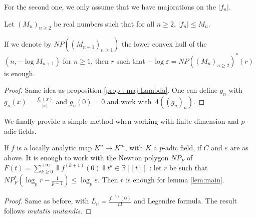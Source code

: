 \documentclass{lms}
\begin{document}
For the second one, we only assume that we have majorations on the $\vert f_n \vert.$

\begin{prop}
Let $(M_n)_{n \geq 2}$ be real numbers such that for all $n \geq 2$, $\vert f_n \vert \leq M_n.$

If we denote by $NP((M_{n+1})_{n \geq 1})$ the lower convex hull of the $(n, -\log M_{n+1})$ for $n \geq 1$, then $r$ such that $-\log \varepsilon=NP((M_n)_{n \geq 2})^*(r)$ is enough.
\end{prop}
\begin{proof}
Same idea as proposition \ref{prop : maj Lambda}. One can define $g_n$ with $g_n (x) =\frac{f_n(x)}{\vert x \vert}$ and $g_n(0)=0$ and work with $\Lambda ((g_n)_n).$
\end{proof}

We finally provide a simple method when working with finite dimension and $p$-adic fields.

\begin{prop} \label{prop : locanalyticfinitedim}
If $f$ is a locally analytic map $K^n \rightarrow K^m$, with $K$ a $p$-adic field, if $C$ and $\varepsilon$ are as above. It is enough to work with the Newton polygon $NP_F$ of $F(t) = \sum_{k\geq 0}^{+\infty} \interleave f^{(k+1)}(0) \interleave  t^k \in \mathbb{R}[[t]]$ : let $r$ be such that $NP_F^* \left( \log_p r - \frac{1}{p-1} \right) \leq \log_p \varepsilon.$ Then $r$ is enough for lemma \ref{lem:main}. 
\end{prop}
\begin{proof}
Same as before, with $L_n=\frac{f^{(n)}(0)}{n!}$ and Legendre formula. The result follows \textit{mutatis mutandis}.
\end{proof}

\end{document}
